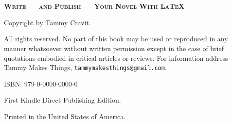 
\chapter*{}\label{copyright}

\begin{center}
\vfill
    \large\textsc{\textbf{Write --- and Publish --- Your Novel With \LaTeX{}}}\normalsize
\vspace{\baselineskip}

\vspace{2\baselineskip}

Copyright  by Tammy Cravit.
\vspace{2\baselineskip}

All rights reserved. No part of this book may be used or reproduced in
any manner whatsoever without written permission except in the case of
brief quotations embodied in critical articles or reviews. For
information address Tammy Makes Things, \texttt{tammymakesthings@gmail.com}.

\vspace{2\baselineskip}

ISBN: 979-0-0000-0000-0

\vspace{\baselineskip}
First Kindle Direct Publishing Edition.

\vspace{\baselineskip}
Printed in the United States of America.
\vfill
\end{center}

